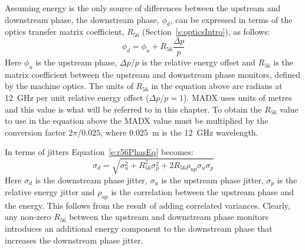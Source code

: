 Assuming energy is the only source of differences between the upstream and downstream phase, the downstream phase, \(\phi_d\), can be expressed in terms of the optics transfer matrix coefficient, \(R_{56}\) (Section~\ref{s:opticsIntro}), as follows:
\begin{equation}
\phi_d = \phi_u + R_{56}\frac{\Delta p}{p}
\label{e:r56PhasEq}
\end{equation}
Here \(\phi_u\) is the upstream phase, \(\Delta p / p\) is the relative energy offset and \(R_{56}\) is the matrix coefficient between the upstream and downstream phase monitors, defined by the machine optics. The units of \(R_{56}\) in the equation above are radians at 12~GHz per unit relative energy offset (\(\Delta p/p = 1\)). MADX uses units of metres and this value is what will be referred to in this chapter. To obtain the \(R_{56}\) value to use in the equation above the MADX value must be multiplied by the conversion factor \(2\pi/0.025\), where 0.025~m is the 12~GHz wavelength.

In terms of jitters Equation~\ref{e:r56PhasEq} becomes:
\begin{equation}
\sigma_d = \sqrt{\sigma_u^2 + R_{56}^2\sigma_{p}^2 + 2R_{56}\rho_{up}\sigma_{u}\sigma_{p}}
\label{e:r56JitEq}
\end{equation}
Here \(\sigma_d\) is the downstream phase jitter, \(\sigma_u\) is the upstream phase jitter, \(\sigma_p\) is the relative energy jitter and \(\rho_{up}\) is the correlation between the upstream phase and the energy. This follows from the result of adding correlated variances. Clearly, any non-zero \(R_{56}\) between the upstream and downstream phase monitors introduces an additional energy component to the downstream phase that increases the downstream phase jitter.

